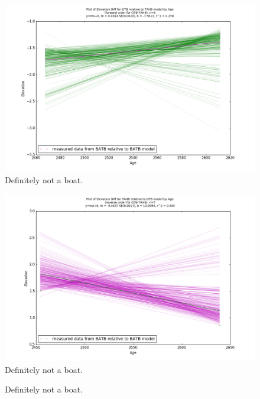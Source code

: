 \begin{figure}[h]
	\includegraphics[width=\linewidth]{data/gias/theGIA_GTB_relative_to_TAHB.png}
	\caption{Definitely not a boat.}
	\label{fig:gias_GTBxTAHB}
\end{figure}
\newpage


\begin{figure}[h]
	\includegraphics[width=\linewidth]{data/gias/theGIA_TAHB_relative_to_GTB.png}
	\caption{Definitely not a boat.}
	\label{fig:gias_TAHBxGTB}
\end{figure}
\newpage


\begin{figure}[h]
	\caption{Definitely not a boat.}
	\label{fig:intervalsGIA}
\end{figure}
\newpage

